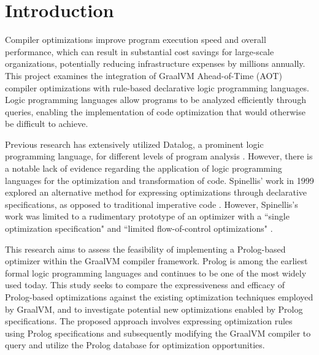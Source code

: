 \chapter[Introduction]{Introduction}

Compiler optimizations improve program execution speed and overall performance, which can result in substantial cost savings for large-scale organizations, potentially reducing infrastructure expenses by millions annually. This project examines the integration of GraalVM Ahead-of-Time (AOT) compiler optimizations with rule-based declarative logic programming languages. Logic programming languages allow programs to be analyzed efficiently through queries, enabling the implementation of code optimization that would otherwise be difficult to achieve.

Previous research has extensively utilized Datalog, a prominent logic programming language, for different levels of program analysis \cite{Bravenboer2009,Tonder2021,Lam2005,Benton2007}. However, there is a notable lack of evidence regarding the application of logic programming languages for the optimization and transformation of code. Spinellis’ work in 1999 explored an alternative method for expressing optimizations through declarative specifications, as opposed to traditional imperative code \cite{Spinellis1999}. However, Spinellis's work was limited to a rudimentary prototype of an optimizer with a ``single optimization specification" and ``limited flow-of-control optimizations" \cite{Spinellis1999}.

This research aims to assess the feasibility of implementing a Prolog-based optimizer within the GraalVM compiler framework. Prolog is among the earliest formal logic programming languages and continues to be one of the most widely used today. This study seeks to compare the expressiveness and efficacy of Prolog-based optimizations against the existing optimization techniques employed by GraalVM, and to investigate potential new optimizations enabled by Prolog specifications. The proposed approach involves expressing optimization rules using Prolog specifications and subsequently modifying the GraalVM compiler to query and utilize the Prolog database for optimization opportunities.
